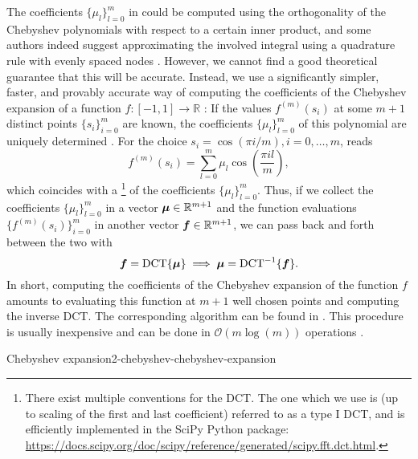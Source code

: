 The coefficients $\{\mu_l\}_{l=0}^{m}$ in 
could be computed using the orthogonality of the Chebyshev polynomials with respect
to a certain inner product, and some authors indeed suggest approximating the
involved integral using a quadrature rule with evenly spaced nodes
\cite[equation~8]{lin2017randomized}.
However, we cannot find a good theoretical guarantee that this will be accurate.
Instead, we use a significantly simpler, faster, and provably accurate way of
computing the coefficients of the Chebyshev expansion of a function
$f:[-1,1] \to \mathbb{R}$ \cite{trefethen2019chebyshev, ahmed1970chebyshev}:
If the values $f^{(m)}(s_i)$ at some $m+1$ distinct points $\{s_i\}_{i=0}^m$ are
known, the coefficients $\{\mu_l\}_{l=0}^{m}$ of this polynomial are
uniquely determined \cite{gauss1799demonstratio}. For the choice $s_i = \cos(\pi i/m), i=0,\dots,m$,
 reads
\begin{equation}
    f^{(m)}(s_i) = \sum_{l=0}^{m} \mu_l \cos\left(\frac{\pi i l}{m}\right),
    \label{equ:2-chebyshev-chebyshev-nodes-evaluation}
\end{equation}
which coincides with a \footnote{There exist multiple conventions for the \gls{DCT}.
The one which we use is (up to scaling of the first and last coefficient)
referred to as a type I \gls{DCT}, and is efficiently implemented in the SciPy Python package:
\url{https://docs.scipy.org/doc/scipy/reference/generated/scipy.fft.dct.html}.} of the coefficients $\{\mu_l\}_{l=0}^{m}$.
Thus, if we collect the coefficients $\{\mu_l\}_{l=0}^{m}$ in a vector $\boldsymbol{\mu} \in \mathbb{R}^{m+1}$ 
and the function evaluations $\{f^{(m)}(s_i)\}_{i=0}^{m}$ in another
vector $\boldsymbol{f} \in \mathbb{R}^{m+1}$, we can pass back and forth between the
two with
\begin{equation}
    \boldsymbol{f} = \operatorname{DCT} \{ \boldsymbol{\mu} \} \implies \boldsymbol{\mu} = \operatorname{DCT}^{-1}\{ \boldsymbol{f} \}.
    \label{equ:2-chebyshev-chebyshev-DCT}
\end{equation}
In short, computing the coefficients of the Chebyshev expansion 
of the function $f$ amounts to evaluating this function at $m+1$ well
chosen points and computing the inverse \gls{DCT}. The corresponding algorithm
can be found in .
This procedure is usually inexpensive and can be done in $\mathcal{O}(m \log(m))$
operations \cite{makhoul1980fct}.

\begin{algo}{Chebyshev expansion}{2-chebyshev-chebyshev-expansion}
    
\end{algo}

